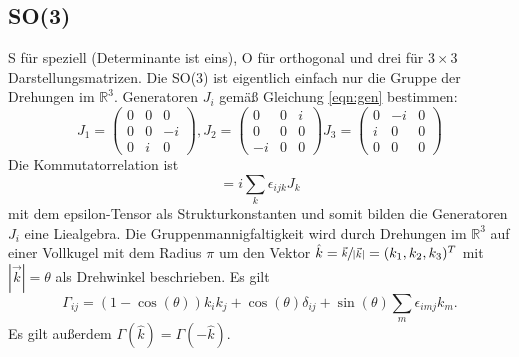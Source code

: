 \documentclass[
  captions=tableheading,  %
  titlepage=firstiscover, %
]{scrartcl}
\begin{document}
\subsection{SO(3)}
S für speziell (Determinante ist eins), O für orthogonal und drei für $3 \times 3$ Darstellungsmatrizen.
Die SO(3) ist eigentlich einfach nur  die Gruppe der Drehungen im $\mathbb{R}^3$.
Generatoren $J_i$ gemäß Gleichung \eqref{eqn:gen} bestimmen:
\begin{equation*}
  J_1 = 
  \begin{pmatrix}
    0 & 0 & 0   \\
    0 & 0 & -i  \\
    0 & i & 0 
  \end{pmatrix}, 
  J_2 = 
  \begin{pmatrix}
    0 & 0   & i \\
    0 & 0   & 0 \\
    -i & 0  & 0 
  \end{pmatrix}
  J_3= 
  \begin{pmatrix}
    0 & -i  & 0 \\
    i & 0   & 0 \\
    0 & 0   & 0 
  \end{pmatrix}
\end{equation*}
Die Kommutatorrelation ist 
\begin{equation*}
  [J_i, J_j] = i \sum_k \epsilon_{ijk} J_k 
\end{equation*}
mit dem epsilon-Tensor als Strukturkonstanten und somit bilden die Generatoren $J_i$ eine Liealgebra.
Die Gruppenmannigfaltigkeit wird durch  Drehungen im $\mathbb{R}^3$ auf einer Vollkugel mit dem Radius $\pi$ 
um den Vektor $\hat{k} = \sfrac{\vec{k}}{|\vec{k}|} = (k_1, k_2, k_3)^T$ mit $|\vec{k}| = \theta$ als
Drehwinkel beschrieben.
Es gilt 
\begin{equation*}
  \Gamma_{ij} = (1-\cos(\theta)) k_i k_j + \cos(\theta) \delta_{ij} + \sin(\theta) \sum_m \epsilon_{imj}k_m.
\end{equation*}
Es gilt außerdem $\Gamma(\hat{k}) = \Gamma(-\hat{k})$.
\end{document}
